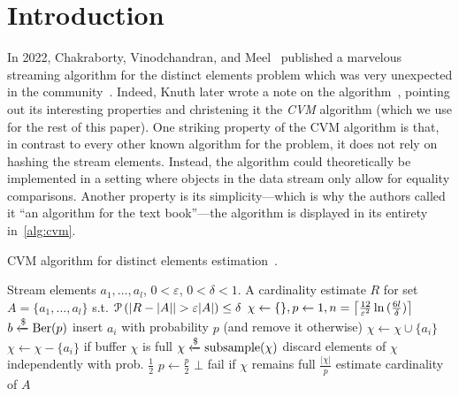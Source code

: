 \section{Introduction}
\label{sec:intro}

In 2022, Chakraborty, Vinodchandran, and Meel~\cite{chakraborty2022} published a marvelous streaming algorithm for the distinct elements problem which was very unexpected in the community~\cite{quanta}.
Indeed, Knuth later wrote a note on the algorithm~\cite{knuthnote}, pointing out its interesting properties and christening it the \emph{CVM} algorithm (which we use for the rest of this paper).
One striking property of the CVM algorithm is that, in contrast to every other known algorithm for the problem, it does not rely on hashing the stream elements.
Instead, the algorithm could theoretically be implemented in a setting where objects in the data stream only allow for equality comparisons.
Another property is its simplicity---which is why the authors called it ``an algorithm for the text book''---the algorithm is displayed in its entirety in~\cref{alg:cvm}.

\begin{algorithm}[h!]
	\caption{CVM algorithm for distinct elements estimation~\cite{chakraborty2022}.}\label{alg:cvm}
	\begin{algorithmic}[1]
  \Require Stream elements $a_1,\dots,a_l$, $0 < \varepsilon$, $0 < \delta < 1$.
  \Ensure A cardinality estimate $R$ for set $A = \{ a_1,\dots,a_l \}$ s.t. $\prob \left( |R - |A| | > \varepsilon |A| \right) \leq \delta$
  \State $\chi \gets \{\}, p \gets 1, n = \ceil*{\frac{12}{\varepsilon^2} \ln{(\frac{6l}{\delta})} }$
    \State $b \getsr \Ber(p)$ \Comment insert $a_i$ with probability $p$ (and remove it otherwise)
      \State $\chi \gets \chi \cup \{a_i\}$
    \Else
      \State $\chi \gets \chi - \{a_i\}$
    \EndIf
     \Comment if buffer $\chi$ is full
      \State $\chi \getsr \mathrm{subsample}(\chi)$ \Comment discard elements of $\chi$ independently with prob. $\frac{1}{2}$
      \State $p \gets \frac{p}{2}$
    \EndIf
      \Return $\bot$ \Comment fail if $\chi$ remains full
    \EndIf
  \EndFor
  \State \Return $\frac{|\chi|}{p}$ \Comment estimate cardinality of $A$
  \end{algorithmic}
\end{algorithm}

